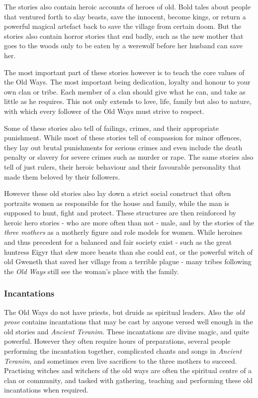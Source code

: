The stories also contain heroic accounts of heroes of old. Bold tales about
people that ventured forth to slay beasts, save the innocent, become kings, or
return a powerful magical artefact back to save the village from certain doom.
But the stories also contain horror stories that end badly, such as the new
mother that goes to the woods only to be eaten by a werewolf before her
husband can save her.

The most important part of these stories however is to teach the core values of
the Old Ways. The most important being dedication, loyalty and honour to your
own clan or tribe. Each member of a clan should give what he can, and take as
little as he requires. This not only extends to love, life, family but also
to nature, with which every follower of the Old Ways must strive to respect.

Some of these stories also tell of failings, crimes, and their appropriate
punishment. While most of these stories tell of compassion for minor offences,
they lay out brutal punishments for serious crimes and even include the death
penalty or slavery for severe crimes such as murder or rape. The same stories
also tell of just rulers, their heroic behaviour and their favourable
personality that made them beloved by their followers.

However these old stories also lay down a strict social construct that often
portraits women as responsible for the house and family, while the man is
supposed to hunt, fight and protect. These structures are then reinforced by
heroic hero stories - who are more often than not - male, and by the stories
of the \emph{three mothers} as a motherly figure and role models for women.
While heroines and thus precedent for a balanced and fair society exist - such
as the great huntress Eigyr that slew more beasts than she could eat, or the
powerful witch of old Gweneth that saved her village from a terrible plague -
many tribes following the \emph{Old Ways} still see the woman's place with
the family.

\subsubsection*{Incantations}

The Old Ways do not have priests, but druids as spiritual leaders. Also the
\emph{old prose} contains incantations that may be cast by anyone versed well
enough in the old stories and \emph{Ancient Teranim}. These incantations are
divine magic, and quite powerful. However they often require hours of
preparations, several people performing the incantation together, complicated
chants and songs in \emph{Ancient Teranim}, and sometimes even live sacrifices
to the three mothers to succeed. Practising witches and witchers of the old
ways are often the spiritual centre of a clan or community, and tasked with
gathering, teaching and performing these old incantations when required.
